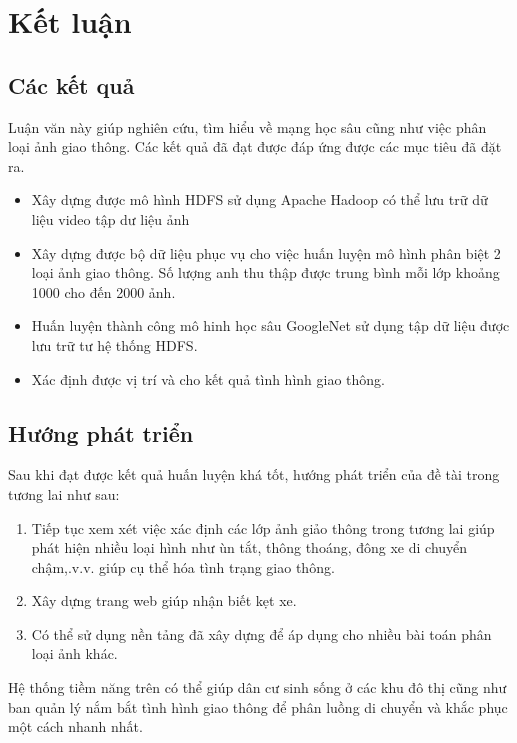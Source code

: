 \chapter{Kết luận}

\section{Các kết quả }
Luận văn này giúp nghiên cứu, tìm hiểu về mạng học sâu cũng như việc phân loại ảnh giao thông. Các kết quả đã đạt được đáp ứng được các mục tiêu đã đặt ra.
	\begin{itemize}
		\item Xây dựng được mô hình HDFS sử dụng Apache Hadoop có thể lưu trữ dữ liệu video tập dư liệu ảnh
		\item Xây dựng được bộ dữ liệu phục vụ cho việc huấn luyện mô hình phân biệt 2 loại ảnh giao thông. Số lượng anh thu thập được trung bình mỗi lớp khoảng 1000 cho đến 2000 ảnh.
		\item Huấn luyện thành công mô hinh học sâu GoogleNet sử dụng tập dữ liệu được lưu trữ tư hệ thống HDFS.
		\item Xác định được vị trí và cho kết quả tình hình giao thông.	
	\end{itemize}
\section{Hướng phát triển}
Sau khi đạt được kết quả huấn luyện khá tốt, hướng phát triển của đề tài trong tương lai như sau:
\begin{enumerate}
	\item Tiếp tục xem xét việc xác định các lớp ảnh giảo thông trong tương lai giúp phát hiện nhiều loại hình như ùn tắt, thông thoáng, đông xe di chuyển chậm,.v.v. giúp cụ thể hóa tình trạng giao thông.
	\item Xây dựng trang web giúp nhận biết kẹt xe.
	\item Có thể sử dụng nền tảng đã xây dựng để áp dụng cho nhiều bài toán phân loại ảnh khác.
\end{enumerate}
	

Hệ thống tiềm năng trên có thể giúp dân cư sinh sống ở các khu đô thị cũng như ban quản lý nắm bắt tình hình giao thông để phân luồng di chuyển và khắc phục một cách nhanh nhất.
